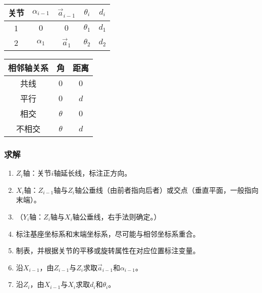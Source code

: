 \documentclass[
12pt, %
a4paper, 
oneside, %
headinclude,footinclude, %
]{scrartcl}
\begin{document}
\begin{minipage}{0.48\textwidth}
\centering
{}
\begin{tabular}{c|cccc}
\hline
关节 & $ \alpha_{i - 1} $ & $ \vec a_{i - 1} $ & $ \theta_i $ & $ d_i $ \\
\hline
1 & $ 0 $ & $ 0 $ & $ \theta_1 $ & $ d_1 $ \\
2 & $ \alpha_1 $ & $ \vec a_1 $ & $ \theta_2 $ & $ d_2 $ \\
\hline
\end{tabular}
\end{minipage}
\hfill
\begin{minipage}{0.48\textwidth}
\centering
{}
\begin{tabular}{c|cc}
\hline
相邻轴关系 & 角 & 距离 \\
\hline
共线 & $ 0 $ & $ 0 $ \\
平行 & $ 0 $ & $ d $ \\
相交 & $ \theta $ & $ 0 $ \\
不相交 & $ \theta $ & $ d $ \\
\hline
\end{tabular}
\end{minipage}
\subsubsection[求解]{求解}
\begin{enumerate}
\item $ Z_i $轴：关节$ i $轴延长线，标注正方向。
\item $ X_i $轴：$ Z_{i - 1} $轴与$ Z_i $轴公垂线（由前者指向后者）或交点（垂直平面，一般指向末端）。
\item （$ Y_i $轴：$ Z_i $轴与$ X_i $轴公垂线，右手法则确定。）
\item 标注基座坐标系和末端坐标系，尽可能与相邻坐标系重合。
\item 制表，并根据关节的平移或旋转属性在对应位置标注变量。
\item 沿$ X_{i - 1} $，由$ Z_{i - 1} $与$ Z_i $求取$ \vec a_{i - 1}  $和$ \alpha_{i - 1} $。
\item 沿$ Z_i $，由$ X_{i - 1} $与$ X_i $求取$ d_i $和$ \theta_i $。
\end{enumerate}
\end{document}

